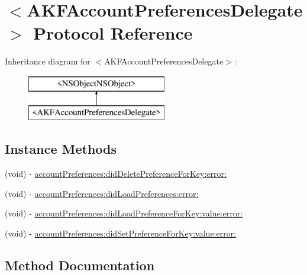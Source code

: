 \hypertarget{protocol_a_k_f_account_preferences_delegate-p}{}\section{$<$A\+K\+F\+Account\+Preferences\+Delegate$>$ Protocol Reference}
\label{protocol_a_k_f_account_preferences_delegate-p}
Inheritance diagram for $<$A\+K\+F\+Account\+Preferences\+Delegate$>$\+:\begin{figure}[H]
\begin{center}
\leavevmode
\includegraphics[height=2.000000cm]{protocol_a_k_f_account_preferences_delegate-p}
\end{center}
\end{figure}
\subsection*{Instance Methods}
\begin{DoxyCompactItemize}
\item 
(void) -\/ \hyperlink{protocol_a_k_f_account_preferences_delegate-p_ac73d86edb22c71b15d463f27ef93eeb3}{account\+Preferences\+:did\+Delete\+Preference\+For\+Key\+:error\+:}
\item 
(void) -\/ \hyperlink{protocol_a_k_f_account_preferences_delegate-p_a5761ea2cb7f31d11d58bbef294da859f}{account\+Preferences\+:did\+Load\+Preferences\+:error\+:}
\item 
(void) -\/ \hyperlink{protocol_a_k_f_account_preferences_delegate-p_a23a3cc383174a976202c8ab2661049db}{account\+Preferences\+:did\+Load\+Preference\+For\+Key\+:value\+:error\+:}
\item 
(void) -\/ \hyperlink{protocol_a_k_f_account_preferences_delegate-p_a0c7c00aaf87f7431029dc3048812b9b7}{account\+Preferences\+:did\+Set\+Preference\+For\+Key\+:value\+:error\+:}
\end{DoxyCompactItemize}


\subsection{Method Documentation}
\hypertarget{protocol_a_k_f_account_preferences_delegate-p_ac73d86edb22c71b15d463f27ef93eeb3}{}
